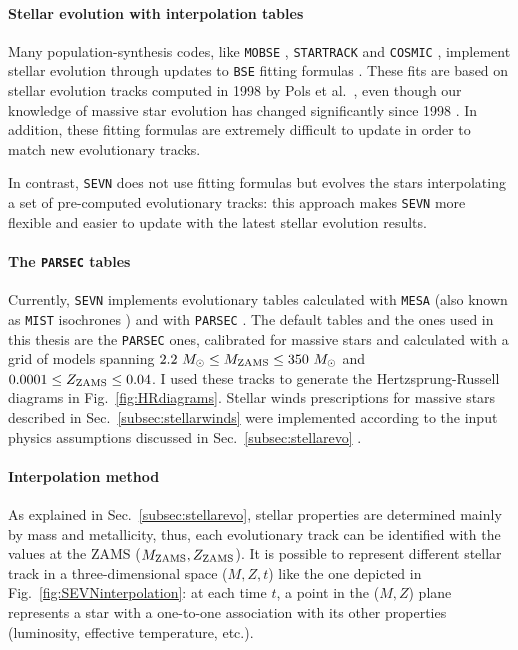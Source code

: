 \documentclass[a4paper,titlepage]{book}     	%
\newcommand{\sun}{\ensuremath{_\odot}}
\newcommand{\mzams}{M_\textup{ZAMS}}
\newcommand{\zzams}{Z_\textup{ZAMS}}
\newcommand{\msun}{\ensuremath{M\sun}}
\begin{document}
\paragraph{Stellar evolution with interpolation tables} Many population-synthesis codes, like \texttt{MOBSE} \cite{giacobbomapelli2018_mobse_fryer}, \texttt{STARTRACK} \cite{Belczynski2010_WRwindsSTARTRACK} and \texttt{COSMIC} \cite{breivik2020cosmicpopsynth}, implement stellar evolution through updates to \texttt{BSE} fitting formulas \cite{hurley2000}. These fits are based on stellar evolution tracks computed in 1998 by Pols et al.\ \cite{Pols1998evotracks}, even though our knowledge of massive star evolution has changed significantly since 1998 \cite{marchant2021_masstransferMESA,klencki2021CE}. In addition, these fitting formulas are extremely difficult to update in order to match new evolutionary tracks. 

In contrast, \texttt{SEVN} does not use fitting formulas but evolves the stars interpolating a set of pre-computed evolutionary tracks: this approach makes \texttt{SEVN} more flexible and easier to update with the latest stellar evolution results.

\paragraph{The \texttt{PARSEC} tables} Currently, \texttt{SEVN} implements evolutionary tables calculated with \texttt{MESA} (also known as \texttt{MIST} isochrones \cite{MIST_Choi2016}) and with \texttt{PARSEC} \cite{parsec2015_chen, MassGapStellarEvo_Costa2021}.  The default tables and the ones used in this thesis are the \texttt{PARSEC} ones, calibrated for massive stars and calculated with a grid of models spanning $2.2~\msun \leq \mzams \leq 350~\msun$ and $0.0001 \leq \zzams \leq 0.04$. I used these tracks to generate the Hertzsprung-Russell diagrams in Fig.\ \ref{fig:HRdiagrams}. Stellar winds prescriptions for massive stars described in Sec.\ \ref{subsec:stellarwinds} were implemented according to the input physics assumptions discussed in Sec.\ \ref{subsec:stellarevo} \cite{parsec2015_chen,MassGapStellarEvo_Costa2021}. 

\paragraph{Interpolation method} As explained in Sec.\ \ref{subsec:stellarevo}, stellar properties are determined mainly by mass and metallicity, thus, each evolutionary track can be identified with the values at the ZAMS ($\mzams,\zzams$). It is possible to represent different stellar track in a three-dimensional space ($M,Z,t$) like the one depicted in Fig.\ \ref{fig:SEVNinterpolation}: at each time $t$, a point in the ($M,Z$) plane represents a star with a one-to-one association with its other properties (luminosity, effective temperature, etc.).
\end{document}
